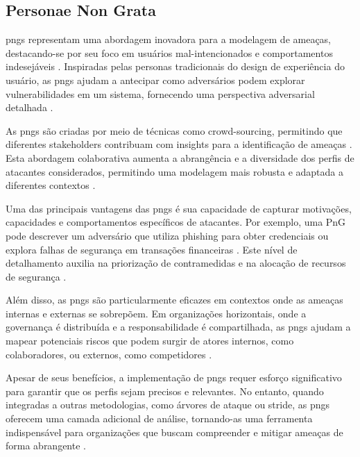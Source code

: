 \subsection{Personae Non Grata}
\label{subsec:personae_non_grata}

\gls{pngs} representam uma abordagem inovadora para a
modelagem de ameaças, destacando-se por seu foco em usuários
mal-intencionados e comportamentos indesejáveis
\cite{PersonaeNonGratae}. Inspiradas pelas personas tradicionais do
design de experiência do usuário, as \gls{pngs} ajudam a antecipar como
adversários podem explorar vulnerabilidades em um sistema, fornecendo
uma perspectiva adversarial detalhada
\cite{PnGRequirementsPhaseThreatModeling}.

As \gls{pngs} são criadas por meio de técnicas como crowd-sourcing,
permitindo que diferentes stakeholders contribuam com insights para a
identificação de ameaças \cite{PnGRequirementsPhaseThreatModeling}.
Esta abordagem colaborativa aumenta a abrangência e a diversidade dos
perfis de atacantes considerados, permitindo uma modelagem mais
robusta e adaptada a diferentes contextos \cite{PersonaeNonGratae}.

Uma das principais vantagens das \gls{pngs} é sua capacidade de capturar
motivações, capacidades e comportamentos específicos de atacantes. Por
exemplo, uma PnG pode descrever um adversário que utiliza phishing
para obter credenciais ou explora falhas de segurança em transações
financeiras \cite{PersonaeNonGratae}. Este nível de detalhamento
auxilia na priorização de contramedidas e na alocação de recursos de
segurança \cite{PnGRequirementsPhaseThreatModeling}.

Além disso, as \gls{pngs} são particularmente eficazes em contextos onde as
ameaças internas e externas se sobrepõem. Em organizações horizontais,
onde a governança é distribuída e a responsabilidade é compartilhada,
as \gls{pngs} ajudam a mapear potenciais riscos que podem surgir de atores
internos, como colaboradores, ou externos, como competidores
\cite{PersonaeNonGratae}.

Apesar de seus benefícios, a implementação de \gls{pngs} requer esforço
significativo para garantir que os perfis sejam precisos e relevantes.
No entanto, quando integradas a outras metodologias, como árvores de
ataque ou \gls{stride}, as \gls{pngs} oferecem uma camada adicional de análise,
tornando-as uma ferramenta indispensável para organizações que buscam
compreender e mitigar ameaças de forma abrangente
\cite{PnGRequirementsPhaseThreatModeling}.

